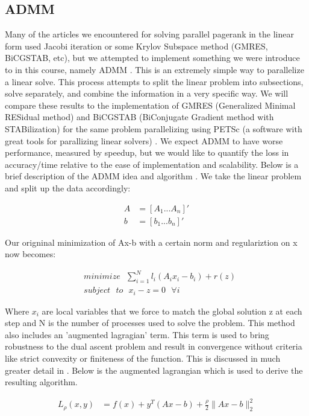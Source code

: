 \documentclass[letterpaper,11pt,onecolumn]{article}
\begin{document}
\subsection{ADMM}

Many of the articles we encountered for solving parallel pagerank in the linear form used Jacobi iteration or some Krylov Subspace method (GMRES, BiCGSTAB, etc), but we attempted to implement something we were introduce to in this course, namely ADMM \cite{ADMM}. This is an extremely simple way to parallelize a linear solve. This process attempts to split the linear problem into subsections, solve separately, and combine the information in a very specific way. 
We will compare these results to the implementation of GMRES (Generalized Minimal RESidual method) and BiCGSTAB (BiConjugate Gradient method with STABilization) for the same problem parallelizing using PETSc (a software with great tools for parallizing linear solvers) \cite{Power Law Graphs}. We expect ADMM to have worse performance, measured by speedup, but we would like to quantify the loss in accuracy/time relative to the ease of implementation and scalability.
\newline
\linebreak
Below is a brief description of the ADMM idea and algorithm \cite{ADMM}.
\newline
We take the linear problem and split up the data accordingly:
\begin{center}
\begin{align}
	A &= \left[ A_{1} ... A_{n} \right]' \\
	b &= \left[ b_{1} ... b_{n} \right]' 
\end{align}
\end{center}
Our origninal minimization of Ax-b with a certain norm and regulariztion on x now becomes:

\begin{center}
\begin{align}
	&minimize \: \: \: \sum_{i=1}^{N} l_{i}(A_{i}x_{i} - b_{i}) + r(z) \\
	&subject \: \: \: to \: \: \: x_{i} - z = 0 \: \: \: \forall i
\end{align}
\end{center}
Where $x_{i}$ are local variables that we force to match the global solution z at each step and N is the number of processes used to solve the problem. This method also includes an 'augmented lagragian' term. This term is used to bring robustness to the dual ascent problem and result in convergence without criteria like strict convexity or finiteness of the function. This is discussed in much greater detail in \cite{ADMM}. Below is the augmented lagrangian which is used to derive the resulting algorithm.
\newline
\begin{center}
  \begin{align}
		L_{\rho}(x,y) &= f(x) + y^{T}(Ax-b) + \frac{\rho}{2}\|Ax - b\|_{2}^{2} \\
  \end{align}
\end{center}
\end{document}
